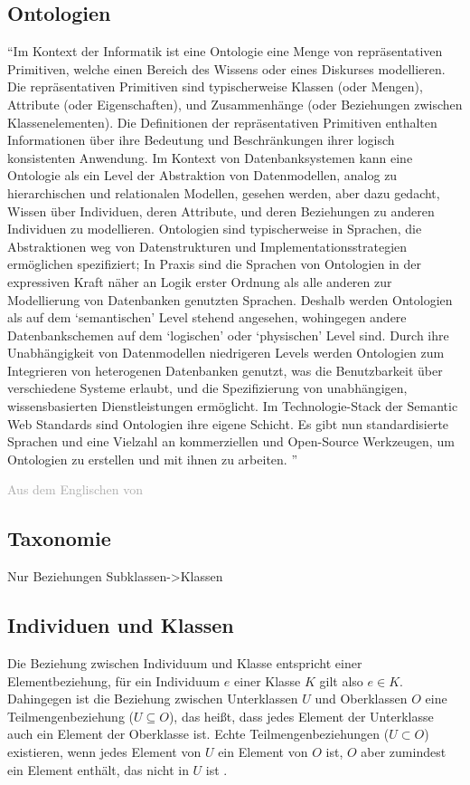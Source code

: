\subsection{Ontologien}
\begin{definition}[Ontologie]
\enquote{Im Kontext der Informatik ist eine Ontologie eine Menge von repräsentativen Primitiven, welche einen Bereich des Wissens oder eines Diskurses modellieren.
Die repräsentativen Primitiven sind typischerweise Klassen (oder Mengen), Attribute (oder Eigenschaften), und Zusammenhänge (oder Beziehungen zwischen Klassenelementen).
Die Definitionen der repräsentativen Primitiven enthalten Informationen über ihre Bedeutung und Beschränkungen ihrer logisch konsistenten Anwendung.
Im Kontext von Datenbanksystemen kann eine Ontologie als ein Level der Abstraktion von Datenmodellen, analog zu hierarchischen und relationalen Modellen, gesehen werden, aber dazu gedacht, Wissen über Individuen, deren Attribute, und deren Beziehungen zu anderen Individuen zu modellieren.
Ontologien sind typischerweise in Sprachen, die Abstraktionen weg von Datenstrukturen und Implementationsstrategien ermöglichen spezifiziert;
In Praxis sind die Sprachen von Ontologien in der expressiven Kraft näher an Logik erster Ordnung als alle anderen zur Modellierung von Datenbanken genutzten Sprachen.
Deshalb werden Ontologien als auf dem \enquote{semantischen} Level stehend angesehen, wohingegen andere Datenbankschemen auf dem \enquote{logischen} oder \enquote{physischen} Level sind.
Durch ihre Unabhängigkeit von Datenmodellen niedrigeren Levels werden Ontologien zum Integrieren von heterogenen Datenbanken genutzt, was die Benutzbarkeit über verschiedene Systeme erlaubt, und die Spezifizierung von unabhängigen, wissensbasierten  Dienstleistungen ermöglicht.
Im Technologie-Stack der Semantic Web Standards sind Ontologien ihre eigene Schicht.
Es gibt nun standardisierte Sprachen und eine Vielzahl an kommerziellen und Open-Source Werkzeugen, um Ontologien zu erstellen und mit ihnen zu arbeiten.
}
\end{definition}
\textcolor{darkgray}{Aus dem Englischen von \citet{ontologygruber}}
\subsection{Taxonomie}

Nur Beziehungen Subklassen->Klassen

\subsection{Individuen und Klassen}
\label{sec:individuenundklassen}
Die Beziehung zwischen Individuum und Klasse entspricht einer Elementbeziehung,
für ein Individuum $e$ einer Klasse $K$ gilt also $e \in K$.
Dahingegen ist die Beziehung zwischen Unterklassen $U$ und Oberklassen $O$ eine Teilmengenbeziehung ($U \subseteq O$), das heißt, dass jedes Element der Unterklasse auch ein Element der Oberklasse ist.
Echte Teilmengenbeziehungen ($U \subset O$) existieren, wenn jedes Element von $U$ ein Element von $O$ ist, $O$ aber zumindest ein Element enthält, das nicht in $U$ ist \citep[S.~261]{semanticwebgrundlagen}.
